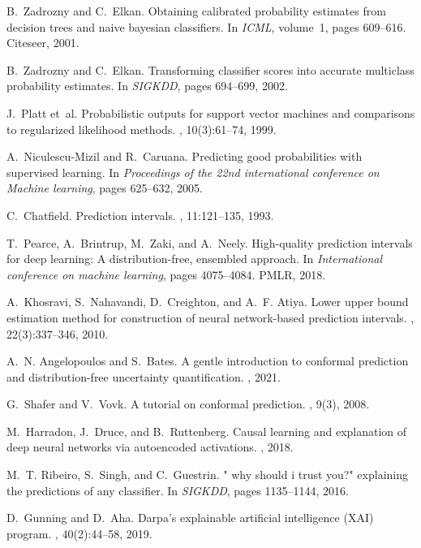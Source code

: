 \documentclass[11pt]{article}
\begin{document}
\begin{thebibliography}{10}
B.~Zadrozny and C.~Elkan.
\newblock Obtaining calibrated probability estimates from decision trees and naive bayesian classifiers.
\newblock In {\em ICML}, volume~1, pages 609--616. Citeseer, 2001.

B.~Zadrozny and C.~Elkan.
\newblock Transforming classifier scores into accurate multiclass probability estimates.
\newblock In {\em SIGKDD}, pages 694--699, 2002.

J.~Platt et~al.
\newblock Probabilistic outputs for support vector machines and comparisons to regularized likelihood methods.
, 10(3):61--74, 1999.

A.~Niculescu-Mizil and R.~Caruana.
\newblock Predicting good probabilities with supervised learning.
\newblock In {\em Proceedings of the 22nd international conference on Machine learning}, pages 625--632, 2005.

C.~Chatfield.
\newblock Prediction intervals.
, 11:121--135, 1993.

T.~Pearce, A.~Brintrup, M.~Zaki, and A.~Neely.
\newblock High-quality prediction intervals for deep learning: A distribution-free, ensembled approach.
\newblock In {\em International conference on machine learning}, pages 4075--4084. PMLR, 2018.

A.~Khosravi, S.~Nahavandi, D.~Creighton, and A.~F. Atiya.
\newblock Lower upper bound estimation method for construction of neural network-based prediction intervals.
, 22(3):337--346, 2010.

A.~N. Angelopoulos and S.~Bates.
\newblock A gentle introduction to conformal prediction and distribution-free uncertainty quantification.
, 2021.

G.~Shafer and V.~Vovk.
\newblock A tutorial on conformal prediction.
, 9(3), 2008.

M.~Harradon, J.~Druce, and B.~Ruttenberg.
\newblock Causal learning and explanation of deep neural networks via autoencoded activations.
, 2018.

M.~T. Ribeiro, S.~Singh, and C.~Guestrin.
\newblock " why should i trust you?" explaining the predictions of any classifier.
\newblock In {\em SIGKDD}, pages 1135--1144, 2016.

D.~Gunning and D.~Aha.
\newblock Darpa’s explainable artificial intelligence ({XAI}) program.
, 40(2):44--58, 2019.

\end{thebibliography}
\end{document}
